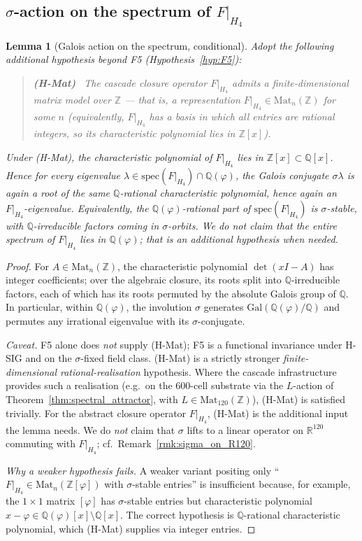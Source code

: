 \documentclass[11pt, a4paper]{amsart}
\newtheorem{lemma}[theorem]{Lemma}
\theoremstyle{definition}
\newcommand{\R}{\mathbb{R}}
\newcommand{\Z}{\mathbb{Z}}
\newcommand{\Q}{\mathbb{Q}}
\newcommand{\pphi}{\varphi}
\begin{document}
\subsection{$\sigma$-action on the spectrum of $F|_{H_4}$}

\begin{lemma}[Galois action on the spectrum, conditional]\label{lem:Fsigma-commute}
Adopt the following additional hypothesis beyond F5
(Hypothesis~\ref{hyp:F5}):
\begin{quote}
\textbf{(H-Mat)} \ The cascade closure operator $F|_{H_4}$ admits a
finite-dimensional matrix model over $\Z$ — that is, a
representation $F|_{H_4} \in \mathrm{Mat}_n(\Z)$ for some $n$
(equivalently, $F|_{H_4}$ has a basis in which all entries are
rational integers, so its characteristic polynomial lies in
$\Z[x]$).
\end{quote}
Under (H-Mat), the characteristic polynomial of $F|_{H_4}$ lies in
$\Z[x] \subset \Q[x]$.  Hence \emph{for every eigenvalue
$\lambda \in \mathrm{spec}(F|_{H_4}) \cap \Q(\varphi)$}, the
Galois conjugate $\sigma\lambda$ is again a root of the same
$\Q$-rational characteristic polynomial, hence again an
$F|_{H_4}$-eigenvalue.  Equivalently, the
$\Q(\varphi)$-rational part of $\mathrm{spec}(F|_{H_4})$ is
$\sigma$-stable, with $\Q$-irreducible factors coming in
$\sigma$-orbits.  We do \emph{not} claim that the entire spectrum
of $F|_{H_4}$ lies in $\Q(\varphi)$; that is an additional
hypothesis when needed.
\end{lemma}

\begin{proof}
For $A \in \mathrm{Mat}_n(\Z)$, the characteristic polynomial
$\det(xI - A)$ has integer coefficients; over the algebraic closure,
its roots split into $\Q$-irreducible factors, each of which has its
roots permuted by the absolute Galois group of $\Q$.  In particular,
within $\Q(\varphi)$, the involution $\sigma$ generates
$\mathrm{Gal}(\Q(\varphi)/\Q)$ and permutes any irrational eigenvalue
with its $\sigma$-conjugate.

\noindent\emph{Caveat.} F5 alone does \emph{not} supply (H-Mat);
F5 is a functional invariance under H-SIG and on the $\sigma$-fixed
field class.  (H-Mat) is a strictly stronger
\emph{finite-dimensional rational-realisation} hypothesis.  Where
the cascade infrastructure provides such a realisation (e.g.\ on
the 600-cell substrate via the $L$-action of
Theorem~\ref{thm:spectral_attractor}, with
$L \in \mathrm{Mat}_{120}(\Z)$), (H-Mat) is satisfied trivially.
For the abstract closure operator $F|_{H_4}$, (H-Mat) is the
additional input the lemma needs.  We do \emph{not} claim that
$\sigma$ lifts to a linear operator on $\R^{120}$ commuting with
$F|_{H_4}$; cf.\ Remark~\ref{rmk:sigma_on_R120}.

\noindent\emph{Why a weaker hypothesis fails.}  A weaker variant
positing only ``$F|_{H_4} \in \mathrm{Mat}_n(\Z[\pphi])$ with
$\sigma$-stable entries'' is insufficient because, for
example, the $1 \times 1$ matrix $[\varphi]$ has $\sigma$-stable
entries but characteristic polynomial $x - \varphi \in \Q(\varphi)[x]
\setminus \Q[x]$.  The correct hypothesis is $\Q$-rational
characteristic polynomial, which (H-Mat) supplies via integer
entries.
\end{proof}
\end{document}
